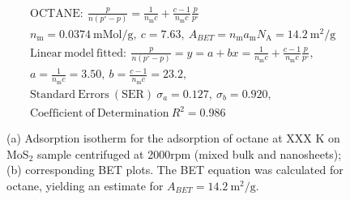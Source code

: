 

\begin{align*}
&\mathrm{OCTANE:}\ \frac{p}{n(p^\circ-p)}=\frac{1}{n_\mathrm{m}c}+\frac{c-1}{n_\mathrm{m}c}\frac{p}{p^\circ}\\
&{n_\mathrm{m}}=0.0374\ \mathrm{mMol/g},\ c=7.63,\ A_{BET}={n_\mathrm{m}}{a_\mathrm{m}}{N_\mathrm{A}}=14.2\ \mathrm{m}^2\mathrm{/g}\\
&\mathrm{Linear\ model\ fitted:}\ \frac{p}{n(p^\circ-p)}=y=a+bx=\frac{1}{n_\mathrm{m}c}+\frac{c-1}{n_\mathrm{m}c}\frac{p}{p^\circ},\\
&a=\frac{1}{n_\mathrm{m}c}=3.50,\ b=\frac{c-1}{n_\mathrm{m}c}=23.2,\\
&\mathrm{Standard\ Errors\ (SER)}\ \sigma_a=0.127,\ \sigma_b=0.920,\\
&\mathrm{Coefficient\ of\ Determination}\ R^2 = 0.986
\end{align*}


\begin{figure}[htb]
\hfill
{}
\caption{(a) Adsorption isotherm for the adsorption of octane at XXX K on MoS$_2$ 
sample centrifuged at 2000rpm (mixed bulk and nanosheets);
(b) corresponding BET plots. The BET equation was calculated for octane, yielding an estimate for $A_{BET}=14.2\ \mathrm{m}^2\mathrm{/g}$.}

\label{fig:sa-Nanosheets-Prep-I-1500rpm-10mg-01-3mm-30C-S2-SA-10ml}
\end{figure}


